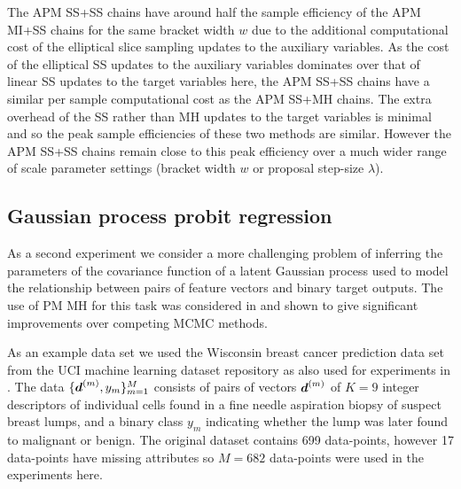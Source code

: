 The \ac{APM} \ac{SS}+\ac{SS} chains have around half the sample efficiency of the \ac{APM} \ac{MI}+\ac{SS} chains for the same bracket width $w$ due to the additional computational cost of the elliptical slice sampling updates to the auxiliary variables. As the cost of the elliptical \ac{SS} updates to the auxiliary variables dominates over that of linear \ac{SS} updates to the target variables here, the \ac{APM} \ac{SS}+\ac{SS} chains have a similar per sample computational cost as the \ac{APM} \ac{SS}+\ac{MH} chains. The extra overhead of the \ac{SS} rather than \ac{MH} updates to the target variables is minimal and so the peak sample efficiencies of these two methods are similar. However the \ac{APM} \ac{SS}+\ac{SS} chains remain close to this peak efficiency over a much wider range of scale parameter settings (bracket width $w$ or proposal step-size $\lambda$).


\subsection{Gaussian process probit regression}\label{subsec:pm-gaussian-process-classifier-exp}

As a second experiment we consider a more challenging problem of inferring the parameters of the covariance function of a latent Gaussian process used to model the relationship between pairs of feature vectors and binary target outputs. The use of \ac{PM} \ac{MH} for this task was considered in \citep{filippone2014pseudo} and shown to give significant improvements over competing \ac{MCMC} methods. 

As an example data set we used the Wisconsin breast cancer prediction data set \citep{mangasarian1995breast} from the UCI machine learning dataset repository \citep{lichman2013uci} as also used for experiments in \citep{filippone2014pseudo}. The data $\lbrace \boldsymbol{d}^{(m)},y_m \rbrace_{m=1}^M$ consists of pairs of vectors $\boldsymbol{d}^{(m)}$ of $K=9$ integer descriptors of individual cells found in a fine needle aspiration biopsy of suspect breast lumps, and a binary class $y_m$ indicating whether the lump was later found to malignant or benign. The original dataset contains 699 data-points, however 17 data-points have missing attributes so $M=682$ data-points were used in the experiments here.

